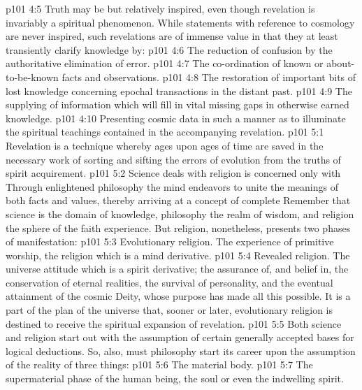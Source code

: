\vs p101 4:5 \pc Truth may be but relatively inspired, even though revelation is invariably a spiritual phenomenon. While statements with reference to cosmology are never inspired, such revelations are of immense value in that they at least transiently clarify knowledge by:
\vs p101 4:6 \bibnobreakspace The reduction of confusion by the authoritative elimination of error.
\vs p101 4:7 \bibnobreakspace The co\hyp{}ordination of known or about\hyp{}to\hyp{}be\hyp{}known facts and observations.
\vs p101 4:8 \bibnobreakspace The restoration of important bits of lost knowledge concerning epochal transactions in the distant past.
\vs p101 4:9 \bibnobreakspace The supplying of information which will fill in vital missing gaps in otherwise earned knowledge.
\vs p101 4:10 \bibnobreakspace Presenting cosmic data in such a manner as to illuminate the spiritual teachings contained in the accompanying revelation.
\vs p101 5:1 Revelation is a technique whereby ages upon ages of time are saved in the necessary work of sorting and sifting the errors of evolution from the truths of spirit acquirement.
\vs p101 5:2 Science deals with  religion is concerned only with  Through enlightened philosophy the mind endeavors to unite the meanings of both facts and values, thereby arriving at a concept of complete  Remember that science is the domain of knowledge, philosophy the realm of wisdom, and religion the sphere of the faith experience. But religion, nonetheless, presents two phases of manifestation:
\vs p101 5:3 \bibnobreakspace Evolutionary religion. The experience of primitive worship, the religion which is a mind derivative.
\vs p101 5:4 \bibnobreakspace Revealed religion. The universe attitude which is a spirit derivative; the assurance of, and belief in, the conservation of eternal realities, the survival of personality, and the eventual attainment of the cosmic Deity, whose purpose has made all this possible. It is a part of the plan of the universe that, sooner or later, evolutionary religion is destined to receive the spiritual expansion of revelation.
\vs p101 5:5 \pc Both science and religion start out with the assumption of certain generally accepted bases for logical deductions. So, also, must philosophy start its career upon the assumption of the reality of three things:
\vs p101 5:6 \bibnobreakspace The material body.
\vs p101 5:7 \bibnobreakspace The supermaterial phase of the human being, the soul or even the indwelling spirit.
